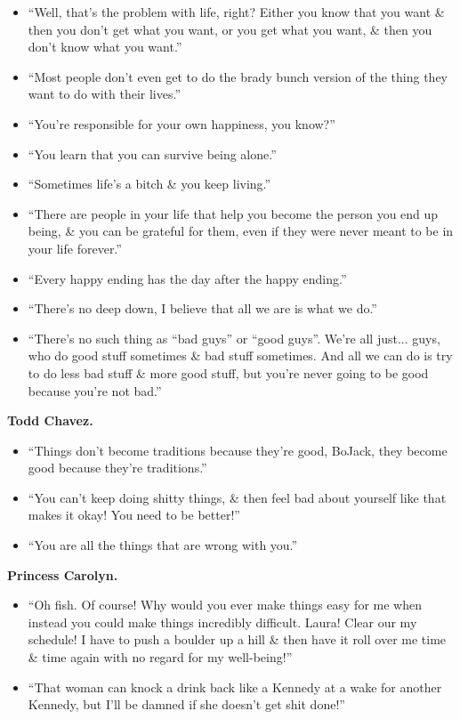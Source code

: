 \documentclass{article}
\begin{document}
\begin{enumerate}
\begin{itemize}
    	\item ``Well, that's the problem with life, right? Either you know that you want \& then you don't get what you want, or you get what you want, \& then you don't know what you want.''
    	\item ``Most people don't even get to do the brady bunch version of the thing they want to do with their lives.''
    	\item ``You're responsible for your own happiness, you know?''
    	\item ``You learn that you can survive being alone.''
    	\item ``Sometimes life's a bitch \& you keep living.''
    	\item ``There are people in your life that help you become the person you end up being, \& you can be grateful for them, even if they were never meant to be in your life forever.''
    	\item ``Every happy ending has the day after the happy ending.''
    	\item ``There's no deep down, I believe that all we are is what we do.''
    	\item ``There's no such thing as ``bad guys'' or ``good guys''. We're all just... guys, who do good stuff sometimes \& bad stuff sometimes. And all we can do is try to do less bad stuff \& more good stuff, but you're never going to be good because you're not bad.''
    \end{itemize}
    {\bf Todd Chavez.}
    \begin{itemize}
    	\item ``Things don't become traditions because they're good, BoJack, they become good because they're traditions.''
    	\item ``You can't keep doing shitty things, \& then feel bad about yourself like that makes it okay! You need to be better!''
    	\item ``You are all the things that are wrong with you.''
    \end{itemize}
    {\bf Princess Carolyn.}
    \begin{itemize}
    	\item ``Oh fish. Of course! Why would you ever make things easy for me when instead you could make things incredibly difficult. Laura! Clear our my schedule! I have to push a boulder up a hill \& then have it roll over me time \& time again with no regard for my well-being!''
    	\item ``That woman can knock a drink back like a Kennedy at a wake for another Kennedy, but I'll be damned if she doesn't get shit done!''

\end{itemize}
\end{enumerate}
\end{document}
